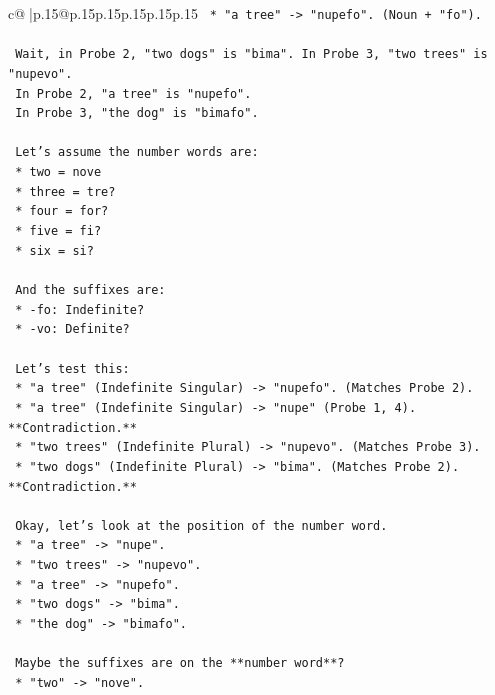 \documentclass{article}
\begin{document}
{\begin{supertabular}{c@{$\;$}|p{.15\linewidth}@{}p{.15\linewidth}p{.15\linewidth}p{.15\linewidth}p{.15\linewidth}p{.15\linewidth}}
{{{\texttt{    *   "a tree" {-}> "nupefo". (Noun + "fo").} \\
\\ 
\texttt{    Wait, in Probe 2, "two dogs" is "bima". In Probe 3, "two trees" is "nupevo".} \\
\texttt{    In Probe 2, "a tree" is "nupefo".} \\
\texttt{    In Probe 3, "the dog" is "bimafo".} \\
\\ 
\texttt{    Let's assume the number words are:} \\
\texttt{    *   two = nove} \\
\texttt{    *   three = tre?} \\
\texttt{    *   four = for?} \\
\texttt{    *   five = fi?} \\
\texttt{    *   six = si?} \\
\\ 
\texttt{    And the suffixes are:} \\
\texttt{    *   {-}fo: Indefinite?} \\
\texttt{    *   {-}vo: Definite?} \\
\\ 
\texttt{    Let's test this:} \\
\texttt{    *   "a tree" (Indefinite Singular) {-}> "nupefo". (Matches Probe 2).} \\
\texttt{    *   "a tree" (Indefinite Singular) {-}> "nupe" (Probe 1, 4). **Contradiction.**} \\
\texttt{    *   "two trees" (Indefinite Plural) {-}> "nupevo". (Matches Probe 3).} \\
\texttt{    *   "two dogs" (Indefinite Plural) {-}> "bima". (Matches Probe 2). **Contradiction.**} \\
\\ 
\texttt{    Okay, let's look at the position of the number word.} \\
\texttt{    *   "a tree" {-}> "nupe".} \\
\texttt{    *   "two trees" {-}> "nupevo".} \\
\texttt{    *   "a tree" {-}> "nupefo".} \\
\texttt{    *   "two dogs" {-}> "bima".} \\
\texttt{    *   "the dog" {-}> "bimafo".} \\
\\ 
\texttt{    Maybe the suffixes are on the **number word**?} \\
\texttt{    *   "two" {-}> "nove".} \\
}}}
\end{supertabular}}
\end{document}
